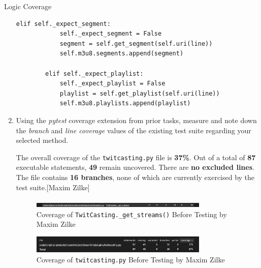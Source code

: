 \documentclass[a4paper]{scrreprt}
\newcounter{question}
\begin{document}
\begin{question}{Logic Coverage}
\begin{enumerate}[topsep=0pt, leftmargin=*]
\begin{answer}
\begin{lstlisting}[caption={Function \texttt{parse\_line} by Yossef Al Buni}, label={lst:parse_line}]
        elif self._expect_segment:
            self._expect_segment = False
            segment = self.get_segment(self.uri(line))
            self.m3u8.segments.append(segment)

        elif self._expect_playlist:
            self._expect_playlist = False
            playlist = self.get_playlist(self.uri(line))
            self.m3u8.playlists.append(playlist)
\end{lstlisting}
          \end{answer}

    \item Using the \textit{pytest} coverage extension from prior tasks, measure and note down the \textit{branch} and \textit{line coverage} values of the existing test suite regarding your selected method.
          \begin{answer}
The overall coverage of the \texttt{twitcasting.py} file is \textbf{37\%}. Out of a total of \textbf{87} executable statements, \textbf{49} remain uncovered. There are \textbf{no excluded lines}. The file contains \textbf{16 branches}, none of which are currently exercised by the test suite.[Maxim Zilke]

\begin{figure}[H]
  \centering
  \includegraphics[width=0.8\textwidth]{get_streams.png}
  \caption{Coverage of \texttt{TwitCasting.\_get\_streams()} Before Testing by Maxim Zilke}
  \label{fig:meinbild}
\end{figure}

\begin{figure}[H]
  \centering
  \includegraphics[width=0.8\textwidth]{twitcasting.png}
  \caption{Coverage of \texttt{twitcasting.py} Before Testing by Maxim Zilke}
  \label{fig:meinbild}
\end{figure}


\end{answer}
\end{enumerate}
\end{question}
\end{document}
